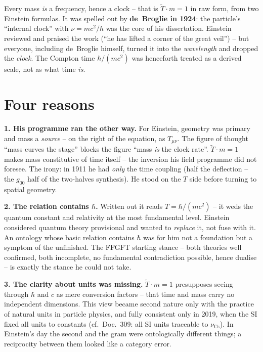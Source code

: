 \documentclass[11pt]{report}
\begin{document}
Every mass \emph{is} a frequency, hence a clock -- that is
$\tilde T \cdot m = 1$ in raw form, from two Einstein formulas. It
was spelled out by \textbf{de~Broglie in 1924}: the particle's
\enquote{internal clock} with $\nu = mc^2/h$ was the core of his
dissertation. Einstein reviewed and praised the work
(\enquote{he has lifted a corner of the great veil}) -- but
everyone, including de~Broglie himself, turned it into the
\emph{wavelength} and dropped the \emph{clock}. The Compton time
$\hbar/(mc^2)$ was henceforth treated as a derived scale, not as
what time \emph{is}.

\section{Four reasons}

\textbf{1. His programme ran the other way.} For Einstein, geometry
was primary and mass a \emph{source} -- on the right of the
equation, as $T_{\mu\nu}$. The figure of thought \enquote{mass
curves the stage} blocks the figure \enquote{mass \emph{is} the
clock rate}. $\tilde T \cdot m = 1$ makes mass constitutive of time
itself -- the inversion his field programme did not foresee. The
irony: in 1911 he had \emph{only} the time coupling (half the
deflection -- the $g_{00}$ half of the two-halves synthesis). He
stood on the $T$ side before turning to spatial geometry.

\textbf{2. The relation contains $\hbar$.} Written out it reads
$T = \hbar/(mc^2)$ -- it weds the quantum constant and relativity
at the most fundamental level. Einstein considered quantum theory
provisional and wanted to \emph{replace} it, not fuse with it. An
ontology whose basic relation contains $\hbar$ was for him not a
foundation but a symptom of the unfinished. The FFGFT starting
stance -- both theories well confirmed, both incomplete, no
fundamental contradiction possible, hence dualise -- is exactly the
stance he could not take.

\textbf{3. The clarity about units was missing.}
$\tilde T \cdot m = 1$ presupposes seeing through $\hbar$ and $c$
as mere conversion factors -- that time and mass carry no
independent dimensions. This view became second nature only with
the practice of natural units in particle physics, and fully
consistent only in 2019, when the SI fixed all units to constants
(cf.\ Doc.~309: all SI units traceable to $\nu_\text{Cs}$). In
Einstein's day the second and the gram were ontologically different
things; a reciprocity between them looked like a category error.
\end{document}
